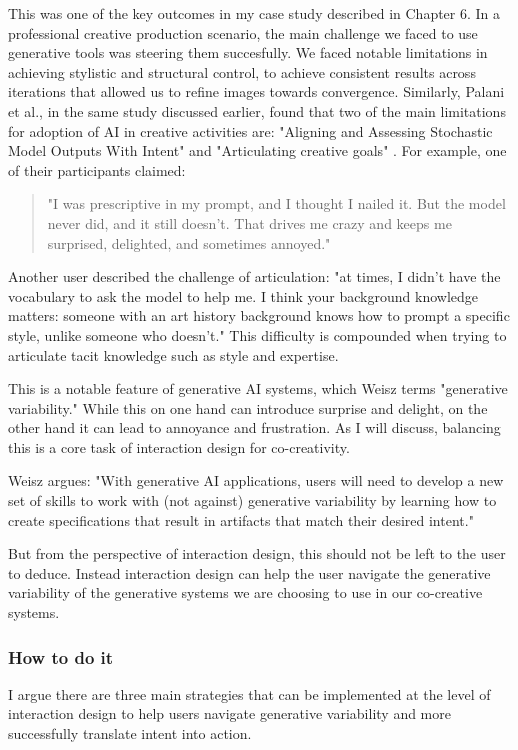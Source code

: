 This was one of the key outcomes in my case study described in Chapter 6. In a professional creative production scenario, the main challenge we faced to use generative tools was steering them succesfully. We faced notable limitations in achieving stylistic and structural control, to achieve consistent results across iterations that allowed us to refine images towards convergence. Similarly, Palani et al., in the same study discussed earlier, found that two of the main limitations for adoption of AI in creative activities are: "Aligning and Assessing Stochastic Model Outputs With Intent" and "Articulating creative goals" \cite{Palani2024-on}. For example, one of their participants claimed:
\begin{quote}
"I was prescriptive in my prompt, and I thought I nailed it. But the model never did, and it still doesn’t. That drives me crazy and keeps me surprised, delighted, and sometimes annoyed."
\end{quote}
Another user described the challenge of articulation: "at times, I didn’t have the vocabulary to ask the model to help me. I think your background knowledge matters: someone with an art history background knows how to prompt a specific style, unlike someone who doesn’t." This difficulty is compounded when trying to articulate tacit knowledge such as style and expertise.

This is a notable feature of generative AI systems, which Weisz \cite{Weisz2024-io} terms "generative variability." While this on one hand can introduce surprise and delight, on the other hand it can lead to annoyance and frustration. As I will discuss, balancing this is a core task of interaction design for co-creativity.

Weisz argues: "With generative AI applications, users will need to develop a new set of skills to work with (not against) generative variability by learning how to create specifications that result in artifacts that match their desired intent." 

But from the perspective of interaction design, this should not be left to the user to deduce. Instead interaction design can help the user navigate the generative variability of the generative systems we are choosing to use in our co-creative systems. 

\subsubsection{How to do it}

I argue there are three main strategies that can be implemented at the level of interaction design to help users navigate generative variability and more successfully translate intent into action. 

